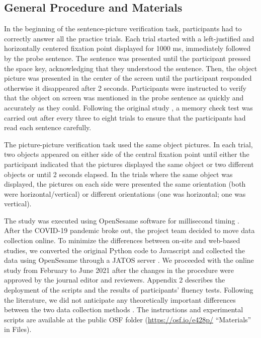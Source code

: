 \documentclass[
  man,floatsintext]{apa6}
\begin{document}
\hypertarget{general-procedure-and-materials}{%
\subsection{General Procedure and Materials}\label{general-procedure-and-materials}}

In the beginning of the sentence-picture verification task, participants had to correctly answer all the practice trials. Each trial started with a left-justified and horizontally centered fixation point displayed for 1000 ms, immediately followed by the probe sentence. The sentence was presented until the participant pressed the space key, acknowledging that they understood the sentence. Then, the object picture \autocite[from][]{zwaanRevisitingMentalSimulation2012} was presented in the center of the screen until the participant responded otherwise it disappeared after 2 seconds. Participants were instructed to verify that the object on screen was mentioned in the probe sentence as quickly and accurately as they could. Following the original study \autocite{stanfield_effect_2001}, a memory check test was carried out after every three to eight trials to ensure that the participants had read each sentence carefully.

The picture-picture verification task used the same object pictures. In each trial, two objects appeared on either side of the central fixation point until either the participant indicated that the pictures displayed the same object or two different objects or until 2 seconds elapsed. In the trials where the same object was displayed, the pictures on each side were presented the same orientation (both were horizontal/vertical) or different orientations (one was horizontal; one was vertical).

The study was executed using OpenSesame software for millisecond timing \autocite{mathotOpenSesameOpensourceGraphical2012}. After the COVID-19 pandemic broke out, the project team decided to move data collection online. To minimize the differences between on-site and web-based studies, we converted the original Python code to Javascript and collected the data using OpenSesame through a JATOS server \autocite{langeJustAnotherTool2015}. We proceeded with the online study from February to June 2021 after the changes in the procedure were approved by the journal editor and reviewers. Appendix 2 describes the deployment of the scripts and the results of participants' fluency tests. Following the literature, we did not anticipate any theoretically important differences between the two data collection methods \autocites[see][]{anwyl-irvineGorillaOurMidst2020,bridgesTimingMegastudyComparing2020a,deleeuwPsychophysicsWebBrowser2016}. The instructions and experimental scripts are available at the public OSF folder (\url{https://osf.io/e428p/} ``Materials'' in Files).
\end{document}
